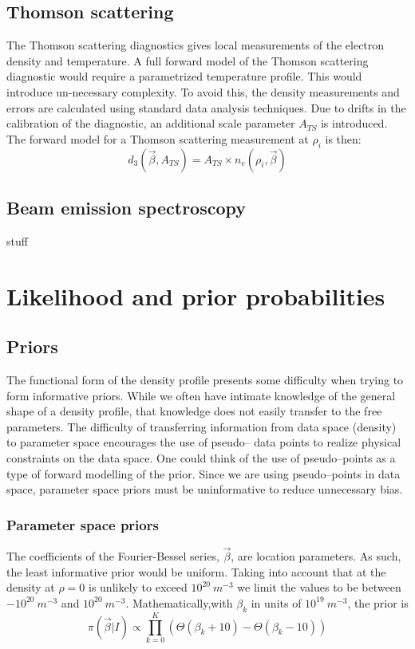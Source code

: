 \documentclass[12pt]{article}
\numberwithin{equation}{section}
\begin{document}
\subsection{Thomson scattering}
The Thomson scattering diagnostics gives local measurements of the electron density and temperature. A full forward model of the Thomson scattering diagnostic would require a parametrized temperature profile. This would introduce un-necessary complexity. To avoid this, the density measurements and errors are calculated using standard data analysis techniques. Due to drifts in the calibration of the diagnostic, an additional scale parameter $A_{TS}$ is introduced. The forward model for a Thomson scattering measurement at $\rho_i$ is then:
\begin{equation} \label{eq:thom_model}
	d_3(\vec{\beta},A_{TS}) = A_{TS} \times n_{e}(\rho_i,\vec{\beta})
\end{equation}
\subsection{Beam emission spectroscopy}
stuff
\section{Likelihood and prior probabilities}
\subsection{Priors}
The functional form of the density profile presents some difficulty when 
trying to form informative priors. While we often have intimate knowledge of 
the general shape of a density profile, that knowledge does not easily 
transfer to the free parameters. The difficulty of transferring information 
from data space (density) to parameter space encourages the use of pseudo--
data points to realize physical constraints on the data space. One could 
think of the use of pseudo--points as a type of forward modelling of the 
prior. Since we are using pseudo--points in data space, parameter space 
priors must be uninformative to reduce unnecessary bias. 
\subsubsection{Parameter space priors}
The coefficients of the Fourier-Bessel series, $\vec{\beta}$, are location 
parameters. As such, the least informative prior would be uniform. Taking 
into account that at the density at $\rho = 0$ is unlikely to exceed $10^{20} 
\: m^{-3}$ we limit the values to be between $-10^{20} \: m^{-3}$ and $10^
{20} \: m^{-3}$. Mathematically,with $\beta_k$ in units of $10^{19}\: m^{-3}$, the prior is
\begin{equation} \label{eq:coeffpriors}
	\pi(\vec{\beta}|I) \propto \prod \limits_{k=0}^{K} (\Theta(\beta_k + 10) 		- \Theta(\beta_k - 10))
\end{equation}
\end{document}

